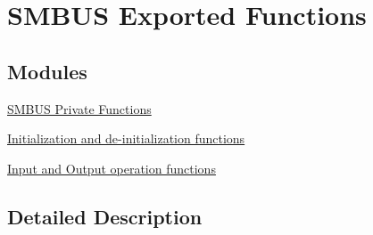 \hypertarget{group___s_m_b_u_s___exported___functions}{}\section{S\+M\+B\+US Exported Functions}
\label{group___s_m_b_u_s___exported___functions}
\subsection*{Modules}
\begin{DoxyCompactItemize}
\item 
\hyperlink{group___s_m_b_u_s___private___functions}{S\+M\+B\+U\+S Private Functions}
\item 
\hyperlink{group___s_m_b_u_s___exported___functions___group1}{Initialization and de-\/initialization functions}
\item 
\hyperlink{group___s_m_b_u_s___exported___functions___group2}{Input and Output operation functions}
\end{DoxyCompactItemize}


\subsection{Detailed Description}
